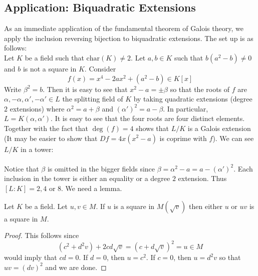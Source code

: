 \documentclass[a4paper]{article}
\begin{document}
\subsection{Application: Biquadratic Extensions}
As an immediate application of the fundamental theorem of Galois theory, we apply the inclusion reversing bijection to biquadratic extensions. The set up is as follows: \\

Let $K$ be a field such that $\text{char}(K)\neq 2$. Let $a,b\in K$ such that $b(a^2-b)\neq 0$ and $b$ is not a square in $K$. Consider $$f(x)=x^4-2ax^2+(a^2-b)\in K[x]$$ Write $\beta^2=b$. Then it is easy to see that $x^2-a=\pm\beta$ so that the roots of $f$ are $\alpha,-\alpha,\alpha',-\alpha'\in L$ the splitting field of $K$ by taking quadratic extensions (degree $2$ extensions) where $\alpha^2=a+\beta$ and $(\alpha')^2=a-\beta$. In particular, $L=K(\alpha,\alpha')$. It is easy to see that the four roots are four distinct elements. Together with the fact that $\deg(f)=4$ shows that $L/K$ is a Galois extension (It may be easier to show that $Df=4x(x^2-a)$ is coprime with $f$). We can see $L/K$ in a tower: \\
\\

Notice that $\beta$ is omitted in the bigger fields since $\beta=\alpha^2-a=a-(\alpha')^2$. Each inclusion in the tower is either an equality or a degree $2$ extension. Thus $[L:K]=2,4$ or $8$. We need a lemma. 

\begin{lmm}{}{} Let $K$ be a field. Let $u,v\in M$. If $u$ is a square in $M(\sqrt{v})$ then either $u$ or $uv$ is a square in $M$. 
\begin{proof}
This follows since $$(c^2+d^2v)+2cd\sqrt{v}=(c+d\sqrt{v})^2=u\in M$$ would imply that $cd=0$. If $d=0$, then $u=c^2$. If $c=0$, then $u=d^2v$ so that $uv=(dv)^2$ and we are done. 
\end{proof}
\end{lmm}
\end{document}
